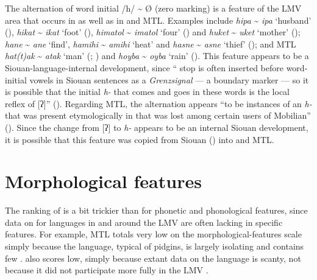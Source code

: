 \documentclass[output=paper]{LSP/langsci}
\begin{document}
The alternation of word initial /h/ \textasciitilde{} Ø (zero marking) is a feature of the LMV area that occurs in  as well as in  and MTL. Examples include  \emph{hipa} \textasciitilde{} \emph{ipa} `husband' (\citealt[42]{GatschetSwanton1932}), \emph{hikat} \textasciitilde{} \emph{ikat} `foot' (\citealt[40]{GatschetSwanton1932}), \emph{himatol} \textasciitilde{} \emph{imatol} `four' (\citealt[41]{GatschetSwanton1932}) and \emph{huket} \textasciitilde{} \emph{uket} `mother' (\citealt[46]{GatschetSwanton1932});  \emph{hane} \textasciitilde{} \emph{ane} `find', \emph{hamihi} \textasciitilde{} \emph{amihi} `heat' and \emph{hasne} \textasciitilde{} \emph{asne} `thief' (\citealt[3]{DorseySwanton1912}); and MTL \emph{hat(t)ak} \textasciitilde{} \emph{atak} `man' (\citealt[88]{Crawford1978}; \citealt[295]{Drechsel1996}) and \emph{hoyba} \textasciitilde{} \emph{oyba} `rain' (\citealt[306]{Drechsel1996}). This feature appears to be a Siouan-language-internal development, since “ stop is often inserted before word-initial vowels in Siouan sentences as a \textit{Grenzsignal} — a boundary marker — so it is possible that the  initial \emph{h-} that comes and goes in these words is the local reflex of [ʔ]”  (\citealt[3]{Rankin2011}). Regarding MTL, the alternation appears “to be instances of an \emph{h-} that was present etymologically in  that was lost among certain users of Mobilian” (\citealt[3]{Rankin2011}). Since the change from [ʔ] to \emph{h-} appears to be an internal Siouan development, it is possible that this feature was copied from Siouan () into  and MTL. 

\section{Morphological features}

The ranking of  is a bit trickier than for phonetic and phonological features, since data on  for languages in and around the LMV are often lacking in specific features. For example, MTL totals very low on the morphological-features scale simply because the language, typical of pidgins, is largely isolating and contains few .  also scores low, simply because extant data on the language is scanty, not because it did not participate more fully in the LMV .
\end{document}
